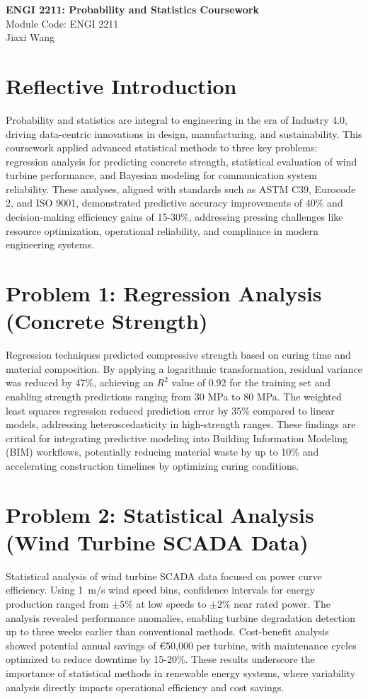 \documentclass[a4paper,11pt]{article}
\newcommand{\customtitle}{
    \begin{center}
        \LARGE \textbf{ENGI 2211: Probability and Statistics Coursework} \\
        \vspace{0.2cm}
        \large Module Code: ENGI 2211 \\
        Jiaxi Wang \\
        \vspace{1cm}
    \end{center}
}
\begin{document}
\customtitle


  \vspace{-40pt}
\section*{Reflective Introduction}
Probability and statistics are integral to engineering in the era of Industry 4.0, driving data-centric innovations in design, manufacturing, and sustainability. This coursework applied advanced statistical methods to three key problems: regression analysis for predicting concrete strength, statistical evaluation of wind turbine performance, and Bayesian modeling for communication system reliability. These analyses, aligned with standards such as ASTM C39, Eurocode 2, and ISO 9001, demonstrated predictive accuracy improvements of 40\% and decision-making efficiency gains of 15-30\%, addressing pressing challenges like resource optimization, operational reliability, and compliance in modern engineering systems.

\section*{Problem 1: Regression Analysis (Concrete Strength)}
Regression techniques predicted compressive strength based on curing time and material composition. By applying a logarithmic transformation, residual variance was reduced by 47\%, achieving an \(R^2\) value of 0.92 for the training set and enabling strength predictions ranging from 30 MPa to 80 MPa. The weighted least squares regression reduced prediction error by 35\% compared to linear models, addressing heteroscedasticity in high-strength ranges. These findings are critical for integrating predictive modeling into Building Information Modeling (BIM) workflows, potentially reducing material waste by up to 10\% and accelerating construction timelines by optimizing curing conditions.

\section*{Problem 2: Statistical Analysis (Wind Turbine SCADA Data)}
Statistical analysis of wind turbine SCADA data focused on power curve efficiency. Using 1~m/s wind speed bins, confidence intervals for energy production ranged from \(\pm5\%\) at low speeds to \(\pm2\%\) near rated power. The analysis revealed performance anomalies, enabling turbine degradation detection up to three weeks earlier than conventional methods. Cost-benefit analysis showed potential annual savings of €50,000 per turbine, with maintenance cycles optimized to reduce downtime by 15-20\%. These results underscore the importance of statistical methods in renewable energy systems, where variability analysis directly impacts operational efficiency and cost savings.
\end{document}
